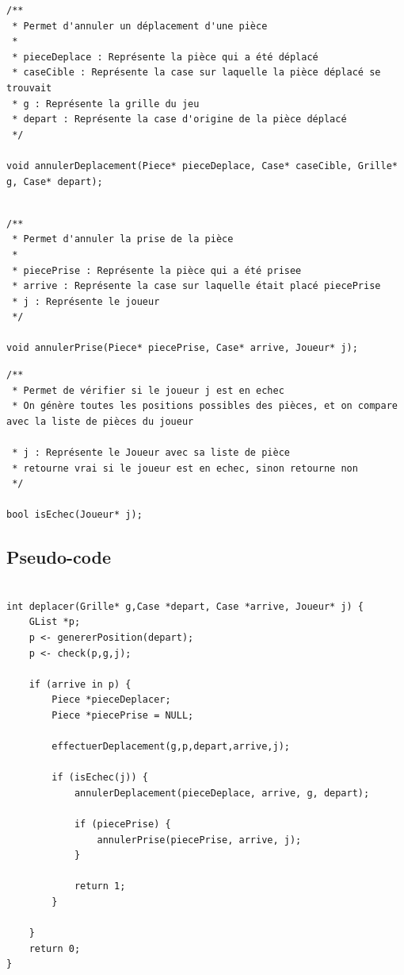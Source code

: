 \documentclass[12pt]{article}
\begin{document}
\begin{lstlisting}
/**
 * Permet d'annuler un déplacement d'une pièce
 * 
 * pieceDeplace : Représente la pièce qui a été déplacé
 * caseCible : Représente la case sur laquelle la pièce déplacé se trouvait
 * g : Représente la grille du jeu 
 * depart : Représente la case d'origine de la pièce déplacé
 */

void annulerDeplacement(Piece* pieceDeplace, Case* caseCible, Grille* g, Case* depart);
\end{lstlisting}

\begin{lstlisting}

/**
 * Permet d'annuler la prise de la pièce
 * 
 * piecePrise : Représente la pièce qui a été prisee
 * arrive : Représente la case sur laquelle était placé piecePrise
 * j : Représente le joueur
 */

void annulerPrise(Piece* piecePrise, Case* arrive, Joueur* j);
\end{lstlisting}

\begin{lstlisting}
/**
 * Permet de vérifier si le joueur j est en echec
 * On génère toutes les positions possibles des pièces, et on compare avec la liste de pièces du joueur

 * j : Représente le Joueur avec sa liste de pièce 
 * retourne vrai si le joueur est en echec, sinon retourne non
 */

bool isEchec(Joueur* j);
\end{lstlisting}

\subsection{Pseudo-code}\label{pseudo-code}

\begin{lstlisting}

int deplacer(Grille* g,Case *depart, Case *arrive, Joueur* j) {
    GList *p;
    p <- genererPosition(depart);
    p <- check(p,g,j);

    if (arrive in p) {
        Piece *pieceDeplacer;
        Piece *piecePrise = NULL;

        effectuerDeplacement(g,p,depart,arrive,j);

        if (isEchec(j)) {
            annulerDeplacement(pieceDeplace, arrive, g, depart);

            if (piecePrise) {
                annulerPrise(piecePrise, arrive, j);
            }

            return 1;
        }

    }
    return 0;
}


\end{lstlisting}
\end{document}
